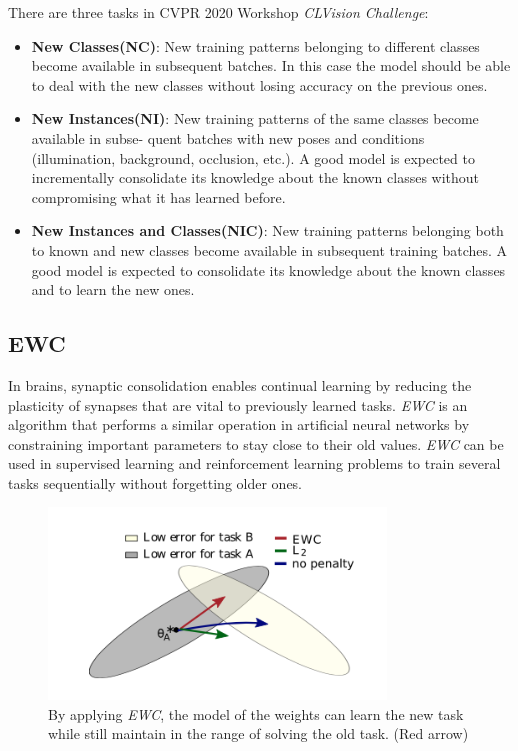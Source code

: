 There are three tasks in CVPR 2020 Workshop \textit{CLVision Challenge}:
\begin{itemize}
\item \textbf{New Classes(NC)}: New training patterns belonging to different classes become available in subsequent batches. In this case the model should be able to deal with the new classes without losing accuracy on the previous ones.
\item \textbf{New Instances(NI)}: New training patterns of the same classes become available in subse- quent batches with new poses and conditions (illumination, background, occlusion, etc.). A good model is expected to incrementally consolidate its knowledge about the known classes without compromising what it has learned before.
\item \textbf{New Instances and Classes(NIC)}: New training patterns belonging both to known and new classes become available in subsequent training batches. A good model is expected to consolidate its knowledge about the known classes and to learn the new ones.
\end{itemize} 

\subsection{EWC}
In brains, synaptic consolidation enables continual learning by reducing the plasticity of synapses that are vital to previously learned tasks.  \textit{EWC} is an algorithm that performs a similar operation in artificial neural networks by constraining important parameters to stay close to their old values. \textit{EWC} can be used in supervised learning and reinforcement learning problems to train several tasks sequentially without forgetting older ones.

\begin{figure}[h]
  \centering
  \captionsetup{width=0.6\textwidth}
  \includegraphics[width=0.8\textwidth]{figure/ewc.png}
  \caption{By applying \textit{EWC}, the model of the weights can learn the new task while still maintain in the range of solving the old task. (Red arrow)}
  \label{EWC}
\end{figure}

